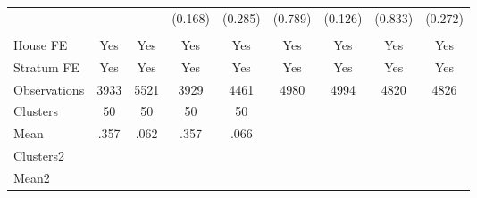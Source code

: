 {\begin{tabular}{l*{8}{c}}
                &         &         &  (0.168)&  (0.285)&  (0.789)&  (0.126)&  (0.833)&  (0.272)\\
                &         &         &         &         &         &         &         &         \\
House FE        &      Yes&      Yes&      Yes&      Yes&      Yes&      Yes&      Yes&      Yes\\
Stratum FE      &      Yes&      Yes&      Yes&      Yes&      Yes&      Yes&      Yes&      Yes\\
\midrule
Observations    &     3933&     5521&     3929&     4461&     4980&     4994&     4820&     4826\\
Clusters        &       50&       50&       50&       50&         &         &         &         \\
Mean            &     .357&     .062&     .357&     .066&         &         &         &         \\
Clusters2       &         &         &         &         &         &         &         &         \\
Mean2           &         &         &         &         &         &         &         &         \\
\bottomrule
\end{tabular}
}
